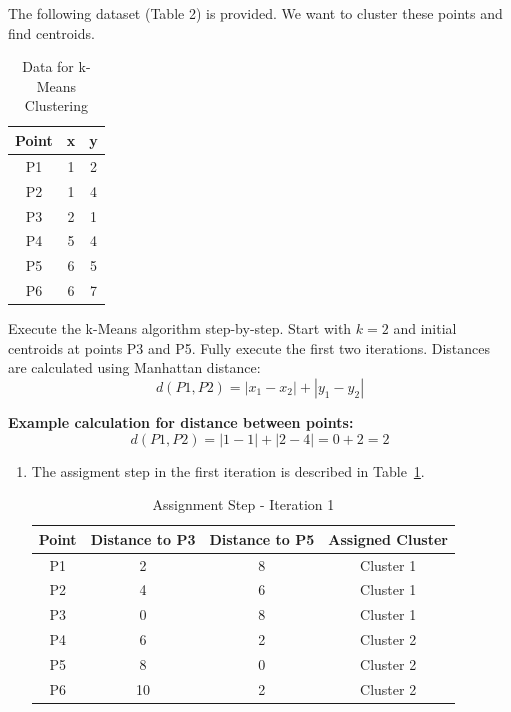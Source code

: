 \documentclass[12pt]{article}
\begin{document}
    \begin{ejercicio}
        The following dataset (Table 2) is provided. We want to cluster these points and find centroids.

        \begin{table}[h!]
        \centering
        \begin{tabular}{|c|c|c|}
        \hline
        \textbf{Point} & \textbf{x} & \textbf{y} \\ \hline
        P1 & 1 & 2 \\ \hline
        P2 & 1 & 4 \\ \hline
        P3 & 2 & 1 \\ \hline
        P4 & 5 & 4 \\ \hline
        P5 & 6 & 5 \\ \hline
        P6 & 6 & 7 \\ \hline
        \end{tabular}
        \caption{Data for k-Means Clustering}
        \end{table}

        Execute the k-Means algorithm step-by-step. Start with $k = 2$ and initial centroids at points P3 and P5. Fully execute the first two iterations. Distances are calculated using Manhattan distance:
        \[ d(P1, P2) = |x_1 - x_2| + |y_1 - y_2| \]

        \textbf{Example calculation for distance between points:}
        \[ d(P1, P2) = |1 - 1| + |2 - 4| = 0 + 2 = 2 \]

        \begin{enumerate}
            \item The assigment step in the first iteration is described in Table~\ref{tab:kmeans_iteration1}.
            \begin{table}[h!]
            \centering
            \begin{tabular}{|c|c|c|c|}
            \hline
            \textbf{Point} & \textbf{Distance to P3} & \textbf{Distance to P5} & \textbf{Assigned Cluster} \\ \hline
            P1 & 2 & 8 & Cluster 1 \\ \hline
            P2 & 4 & 6 & Cluster 1 \\ \hline
            P3 & 0 & 8 & Cluster 1 \\ \hline
            P4 & 6 & 2 & Cluster 2 \\ \hline
            P5 & 8 & 0 & Cluster 2 \\ \hline
            P6 & 10 & 2 & Cluster 2 \\ \hline
            \end{tabular}
            \caption{Assignment Step - Iteration 1}
            \label{tab:kmeans_iteration1}
            \end{table}


\end{enumerate}
\end{ejercicio}
\end{document}
